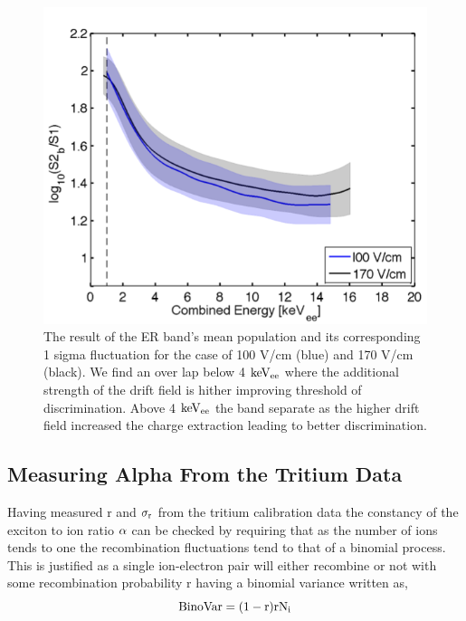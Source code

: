 \begin{figure}[h!]\centering
\includegraphics[width=130mm]{Chapter_Flucs/Figures/Iter1_100/Band_comp.png}
\caption{The result of the ER band's mean population and its corresponding 1 sigma fluctuation for the case of 100 V/cm (blue) and 170 V/cm (black). We find an over lap below 4 $\rm keV_{ee}$ where the additional strength of the drift field is hither improving threshold of discrimination. Above 4 $\rm keV_{ee}$ the band separate as the higher drift field increased the charge extraction leading to better discrimination.}
\label{fig:ER_Band_Calc}
\end{figure}

\newpage

\subsection{Measuring Alpha From the Tritium Data}

Having measured r and $\rm \sigma_r$ from the tritium calibration data the constancy of the exciton to ion ratio $\rm \alpha$ can be checked by requiring that as the number of ions tends to one the recombination fluctuations tend to that of a binomial process. This is justified as a single ion-electron pair will either recombine or not with some recombination probability r having a binomial variance written as,
\begin{equation}
\rm BinoVar= (1-r)rN_i
\label{eq:Bino_Var}
\end{equation}


